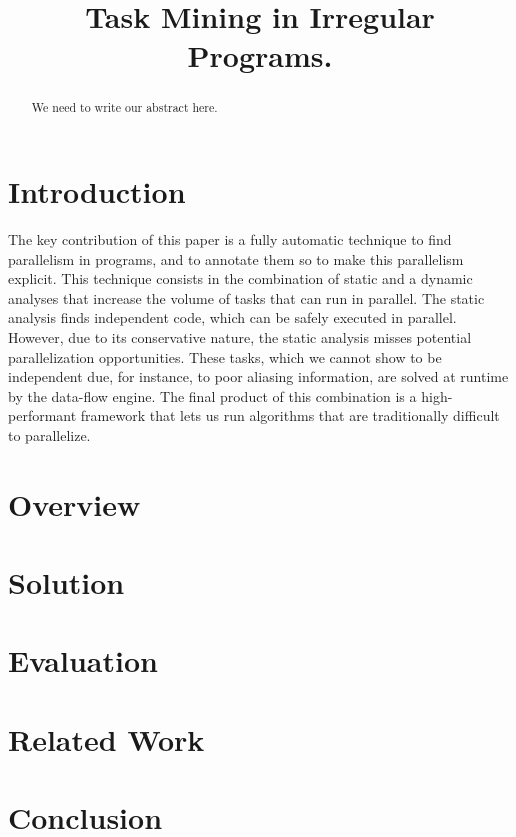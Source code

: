 \documentclass[pageno]{jpaper}
\begin{document}
\title{Task Mining in Irregular Programs.}

\date{}
\maketitle

\thispagestyle{empty}

\begin{abstract}
We need to write our abstract here.
\end{abstract}

\section{Introduction}
\label{sec:intro}

The key contribution of this paper is a fully automatic technique to find parallelism in programs, and to annotate them so to make this parallelism explicit.
This technique consists in the combination of static and a dynamic analyses that increase the volume of tasks that can run in parallel.
The static analysis finds independent code, which can be safely executed in parallel.
However, due to its conservative nature, the static analysis misses potential parallelization opportunities.
These tasks, which we cannot show to be independent due, for instance, to poor aliasing information, are solved at runtime by the data-flow engine.
The final product of this combination is a high-performant framework that
lets us run algorithms that are traditionally difficult to parallelize.

\section{Overview}
\label{sec:ovf}

\section{Solution}
\label{sec:sol}

\section{Evaluation}
\label{sec:eval}

\section{Related Work}
\label{sec:rw}

\section{Conclusion}
\label{sec:conc}



\end{document}
